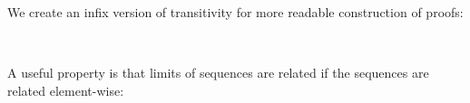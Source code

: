 We create an infix version of transitivity for more readable construction of proofs:
\begin{code}%
%
\>[4]\AgdaSpace{}%
\AgdaSymbol{:}%
\>[12]\AgdaSpace{}%
\AgdaSymbol{\{}\AgdaSpace{}%
\AgdaSpace{}%
\AgdaSymbol{\}}\AgdaSpace{}%
\AgdaSpace{}%
\AgdaSpace{}%
\AgdaSpace{}%
\AgdaSpace{}%
\AgdaSpace{}%
\AgdaSpace{}%
\AgdaSpace{}%
\AgdaSpace{}%
\AgdaSpace{}%
\AgdaSpace{}%
\AgdaSpace{}%
\<%
\\
%
\>[4]\AgdaSpace{}%
\AgdaSpace{}%
\AgdaSpace{}%
\AgdaSymbol{=}\AgdaSpace{}%
\AgdaSpace{}%
\AgdaSpace{}%
\<%
\end{code}
    A useful property is that limits of sequences are related if the sequences are related element-wise:
   \begin{code}%
%
\>[4]\AgdaSpace{}%
\AgdaSymbol{:}\AgdaSpace{}%
%
\>[17]\AgdaSymbol{\{}\AgdaSpace{}%
\AgdaSymbol{:}\AgdaSpace{}%
\AgdaSymbol{\}}\<%
\\
\>[4][@{}l@{\AgdaIndent{0}}]%
\>[6]%
\>[9]\AgdaSymbol{(}\AgdaSpace{}%
\AgdaSpace{}%
\AgdaSymbol{:}\AgdaSpace{}%
\AgdaSpace{}%
\AgdaSpace{}%
\AgdaSpace{}%
\AgdaSymbol{)}\<%
\\
%
\>[6]\AgdaSpace{}%
\AgdaSpace{}%
\AgdaSpace{}%
\AgdaSpace{}%
\AgdaSpace{}%
\AgdaSpace{}%
\AgdaSpace{}%
\AgdaSpace{}%
\AgdaSymbol{)}\<%
\\
%
\>[6]\AgdaSpace{}%
\AgdaSpace{}%
\AgdaSpace{}%
\AgdaSpace{}%
\AgdaSpace{}%
\AgdaSpace{}%
\AgdaSpace{}%
\<%
\\
%
\>[4]\AgdaSpace{}%
\AgdaSymbol{\{}\AgdaSpace{}%
\AgdaSymbol{=}\AgdaSpace{}%
\AgdaSymbol{\}}\AgdaSpace{}%
\AgdaSpace{}%
\AgdaSpace{}%
\<%
\\
\>[4][@{}l@{\AgdaIndent{0}}]%
\>[6]\AgdaSymbol{=}\AgdaSpace{}%
\AgdaSpace{}%
\AgdaSpace{}%
\AgdaSpace{}%
\AgdaSpace{}%
\AgdaSpace{}%
\AgdaSpace{}%
\AgdaSpace{}%
\AgdaSpace{}%
\AgdaSymbol{(}\AgdaSpace{}%
\AgdaSymbol{))}\<%
\end{code}

